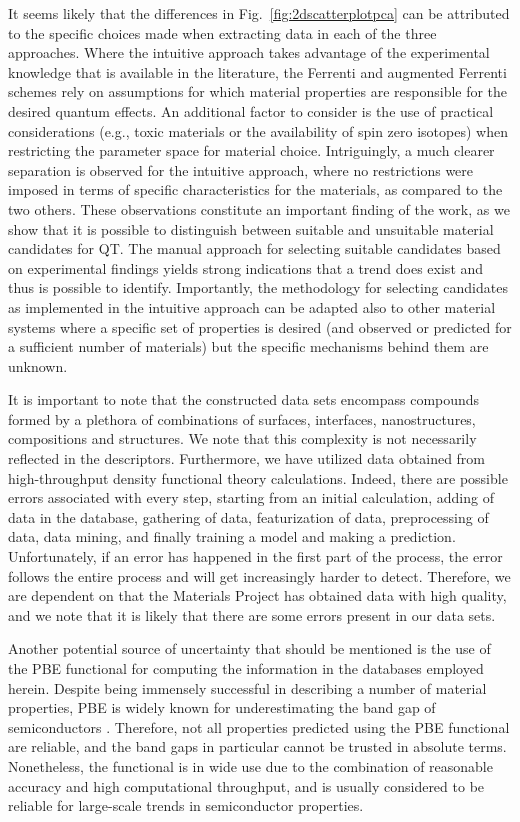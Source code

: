\documentclass[superscriptaddress,unsortedaddress,
 amsmath,amssymb,
 aps,
]{revtex4-2}
\begin{document}
It seems likely that the differences in Fig.~\ref{fig:2dscatterplotpca} can be attributed to the specific choices made when extracting data in each of the three approaches. Where the intuitive approach takes advantage of the experimental knowledge that is available in the literature, the Ferrenti and augmented Ferrenti schemes rely on assumptions for which material properties are responsible for the desired quantum effects. An additional factor to consider is the use of practical considerations (e.g., toxic materials or the availability of spin zero isotopes) when restricting the parameter space for material choice. 
Intriguingly, a much clearer separation is observed for the intuitive approach, where no restrictions were imposed in terms of specific characteristics for the materials, as compared to the two others. 
These observations constitute an important finding of the work, as we show that it is possible to distinguish between suitable and unsuitable material candidates for QT. The manual approach for selecting suitable candidates based on experimental findings yields strong indications that a trend does exist and thus is possible to identify. 
Importantly, the methodology for selecting candidates as implemented in the intuitive approach can be adapted also to other material systems where a specific set of properties is desired (and observed or predicted for a sufficient number of materials) but the specific mechanisms behind them are unknown. 

It is important to note that the constructed data sets encompass compounds formed by a plethora of combinations of surfaces, interfaces, nanostructures, compositions and structures. We note that this complexity is not necessarily reflected in the descriptors. 
Furthermore, we have utilized data obtained from high-throughput density functional theory calculations. Indeed, there are possible errors associated with every step, starting from an initial calculation, adding of data in the database, gathering of data, featurization of data, preprocessing of data, data mining, and finally training a model and making a prediction. Unfortunately, if an error has happened in the first part of the process, the error follows the entire process and will get increasingly harder to detect. Therefore, we are dependent on that the Materials Project has obtained data with high quality, and we note that it is likely that there are some errors present in our data sets.

Another potential source of uncertainty that should be mentioned is the use of the PBE functional for computing the information in the databases employed herein. Despite being immensely successful in describing a number of material properties, PBE is widely known for underestimating the band gap of semiconductors \cite{Freysoldt2014}. Therefore, not all properties predicted using the PBE functional are reliable, and the band gaps in particular cannot be trusted in absolute terms. Nonetheless, the functional is in wide use due to the combination of reasonable accuracy and high computational throughput, and is usually considered to be reliable for large-scale trends in semiconductor properties. 
\end{document}
